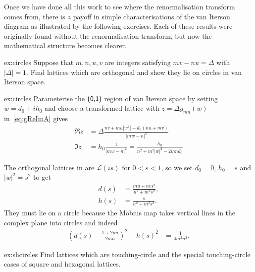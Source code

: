 Once we have done all this work to see where the renormalisation transform comes from, there is a payoff in simple characterisations of the van Iterson diagram  as illustrated by the following exercises. Each of these results were originally found without the renormalisation transform, but now the mathematical structure becomes clearer. 


\begin{jExercise}{ex:circles}
	Suppose that $m ,n ,u, v$ are integers satisfying  $m v - n u =\Delta $ with $|\Delta|=1$.  Find   lattices which are  orthogonal and show they lie on circles in van Iterson space.
\end{jExercise}
\begin{jAnswer}{ex:circles}
	Parameterise the  $\textsf{(0,1)}$ region of van Iterson space by setting $w=d_0+ih_0$ and choose a transformed lattice with $z=\Delta g_{mn}(w)$ in~\eqref{eq:gReImA} gives
	\begin{align}
		\Re z &= 
		\Delta \frac{n v + m u| w^2|	- d_0( n u + m v)}{|m w-n|^2} 
		\label{eq:rez}
		\\
		\Im z &=	h_0 
		\frac{ 1}{|m w-n|^2} =  
		\frac{ h_0}{n^2 + m^2 |w|^2 - 2 m n d_0}
		\label{eq:gReIBm}
	\end{align}
	
	The orthogonal lattices in  are $\mathcal{L}(is)$ for $0<s<1$, so we set $d_0=0$, $h_0=s$ and $|w|^2=s^2$ to get 
	\begin{align}
		d(s) &= \frac{ m u +  n v s^2  }{n^2 +m^2 s^2 },
		\\
		h(s)  &= \frac{s}{n^2 +m^2 s^2  }.
	\end{align}
	They must lie on a circle because the M\"obius map takes vertical lines in the complex plane into circles and indeed
	\begin{align}
		\left( d(s)- \frac{1+2nu}{2mn}\right)^2 + h(s)^2 &= \frac{1}{4 m^2 n^2}.
	\end{align}
	
\end{jAnswer}

\begin{jExercise}{ex:shcircles}
	Find   lattices which are touching-circle and the special touching-circle cases of square and hexagonal lattices. 
	\label{ex:orthogonal}
\end{jExercise}

